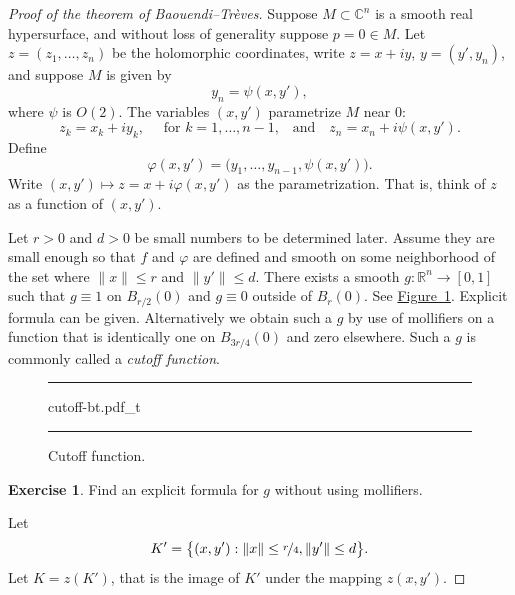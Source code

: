 \documentclass[12pt,openany]{book}
\newcommand{\snorm}[1]{\lVert {#1} \rVert}
\newcommand{\C}{{\mathbb{C}}}
\newcommand{\R}{{\mathbb{R}}}
\newcommand{\myindex}[1]{#1\index{#1}}
\theoremstyle{plain}
\theoremstyle{remark}
\theoremstyle{definition}
\newenvironment{exbox}{%
    \def\FrameCommand{\vrule width 1pt \relax\hspace{10pt}}%
    \MakeFramed{\advance\hsize-\width\FrameRestore}%
}{%
    \endMakeFramed
}
\newenvironment{myfig}{%
\begin{figure}[h!t]
\noindent\rule{\textwidth}{0.5pt}\vspace{12pt}\par\centering}%
{\par\noindent\rule{\textwidth}{0.5pt}
\end{figure}}
\theoremstyle{exercise}
\newtheorem{exercise}{Exercise}[section]
\theoremstyle{example}
\newcommand{\figureref}[1]{\hyperref[#1]{Figure~\ref*{#1}}}
\begin{document}
\begin{proof}[Proof of the theorem of Baouendi--Tr{\`e}ves]
Suppose $M \subset \C^n$ is a smooth real hypersurface, and without loss
of generality suppose $p=0 \in M$.
Let $z=(z_1,\ldots,z_n)$ be the holomorphic coordinates, write $z=x+iy$,
$y=(y',y_n)$, and
suppose $M$ is given by
\begin{equation*}
y_n = \psi(x,y') ,
\end{equation*}
where $\psi$ is $O(2)$.
The variables $(x,y')$ parametrize $M$ near $0$:
\begin{equation*}
z_k = x_k+iy_k , \quad \text{ for $k = 1,\ldots,n-1$,} \quad \text{and} \quad
z_n = x_n + i \psi(x,y') .
\end{equation*}
Define
\begin{equation*}
\varphi(x,y') = \bigl(y_1,\ldots,y_{n-1},\psi(x,y')\bigr) .
\end{equation*}
Write $(x,y') \mapsto z = x + i\varphi(x,y')$ as the parametrization.
That is, think of $z$ as a function of $(x,y')$.

Let $r > 0$ and $d > 0$ be small numbers to be determined later.
Assume they are small enough so
that $f$ and $\varphi$ are defined and smooth on some neighborhood of the
set where $\snorm{x} \leq r$ and $\snorm{y'} \leq d$.
There exists a smooth $g \colon \R^n \to [0,1]$ such that $g \equiv 1$ on
$B_{r/2}(0)$ and $g \equiv 0$ outside of $B_{r}(0)$.
See \figureref{fig:cutoff-bt}.
Explicit formula
can be given.  Alternatively we obtain such a $g$ by use of
mollifiers on a function that is identically one on
$B_{3r/4}(0)$ and zero elsewhere.  Such a $g$ is commonly called a
\emph{\myindex{cutoff function}}.

\begin{myfig}
{cutoff-bt.pdf_t}
\caption{Cutoff function.\label{fig:cutoff-bt}}
\end{myfig}

\begin{exbox}
\begin{exercise}
Find an explicit formula for $g$ without using mollifiers.
\end{exercise}
\end{exbox}

Let
\begin{equation*}
K' = \bigl\{ (x,y') : \snorm{x} \leq \nicefrac{r}{4} , \snorm{y'} \leq d
\bigr\} .
\end{equation*}
Let $K = z(K')$, that is the image of $K'$ under the mapping $z(x,y')$.


\end{proof}
\end{document}
